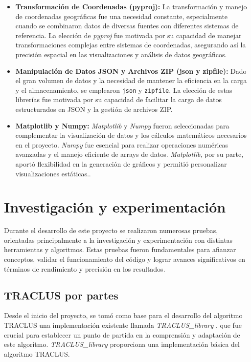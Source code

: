 \begin{itemize}
\begin{itemize}
        \item \textbf{Transformación de Coordenadas (pyproj):} La transformación y manejo de coordenadas geográficas fue una necesidad constante, especialmente cuando se combinaron datos de diversas fuentes con diferentes sistemas de referencia. La elección de \textit{pyproj} fue motivada por su capacidad de manejar transformaciones complejas entre sistemas de coordenadas, asegurando así la precisión espacial en las visualizaciones y análisis de datos geográficos.

        \item \textbf{Manipulación de Datos JSON y Archivos ZIP (json y zipfile):} Dado el gran volumen de datos y la necesidad de mantener la eficiencia en la carga y el almacenamiento, se emplearon \texttt{json} y \texttt{zipfile}. La elección de estas librerías fue motivada por su capacidad de facilitar la carga de datos estructurados en JSON y la gestión de archivos ZIP.

        \item \textbf{Matplotlib y Numpy:} \textit{Matplotlib} y \textit{Numpy} fueron seleccionadas para complementar la visualización de datos y los cálculos matemáticos necesarios en el proyecto. \textit{Numpy} fue esencial para realizar operaciones numéricas avanzadas y el manejo eficiente de arrays de datos. \textit{Matplotlib}, por su parte, aportó flexibilidad en la generación de gráficos y permitió personalizar visualizaciones estáticas..
    \end{itemize}
\end{itemize}

\section{Investigación y experimentación}

Durante el desarrollo de este proyecto se realizaron numerosas pruebas, orientadas principalmente a la investigación y experimentación con distintas herramientas y algoritmos. Estas pruebas fueron fundamentales para afianzar conceptos, validar el funcionamiento del código y lograr avances significativos en términos de rendimiento y precisión en los resultados.

\subsection{TRACLUS por partes}

Desde el inicio del proyecto, se tomó como base para el desarrollo del algoritmo TRACLUS una implementación existente llamada \textit{TRACLUS\_library} \cite{TRACLUS_librery}, que fue crucial para establecer un punto de partida en la comprensión y adaptación de este algoritmo. \textit{TRACLUS\_library} proporciona una implementación básica del algoritmo TRACLUS.

